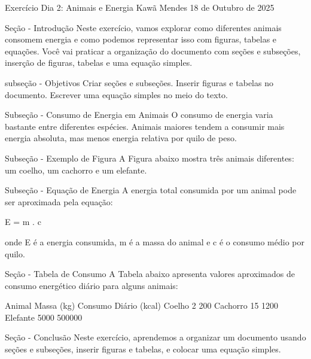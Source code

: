 \documentclass{article}
\begin{document}
Exercício Dia 2: Animais e Energia
Kawã Mendes
18 de Outubro de 2025

Seção - Introdução
Neste exercício, vamos explorar como diferentes animais consomem energia e como podemos representar isso com figuras, tabelas e equações.  
Você vai praticar a organização do documento com seções e subseções, inserção de figuras, tabelas e uma equação simples.

subseção - Objetivos
    Criar seções e subseções.
    Inserir figuras e tabelas no documento.
    Escrever uma equação simples no meio do texto.


Subseção - Consumo de Energia em Animais
O consumo de energia varia bastante entre diferentes espécies. Animais maiores tendem a consumir mais energia absoluta, mas menos energia relativa por quilo de peso.

Subseção - Exemplo de Figura
A Figura abaixo mostra três animais diferentes: um coelho, um cachorro e um elefante.


Subseção - Equação de Energia
A energia total consumida por um animal pode ser aproximada pela equação:

    E = m . c

onde E é a energia consumida, m é a massa do animal e c é o consumo médio por quilo.

Seção - Tabela de Consumo
A Tabela abaixo apresenta valores aproximados de consumo energético diário para alguns animais:

        Animal  Massa (kg)  Consumo Diário (kcal) 
        Coelho  2  200 
        Cachorro  15  1200 
        Elefante  5000  500000 

Seção - Conclusão
Neste exercício, aprendemos a organizar um documento usando seções e subseções, inserir figuras e tabelas, e colocar uma equação simples. 
\end{document}
